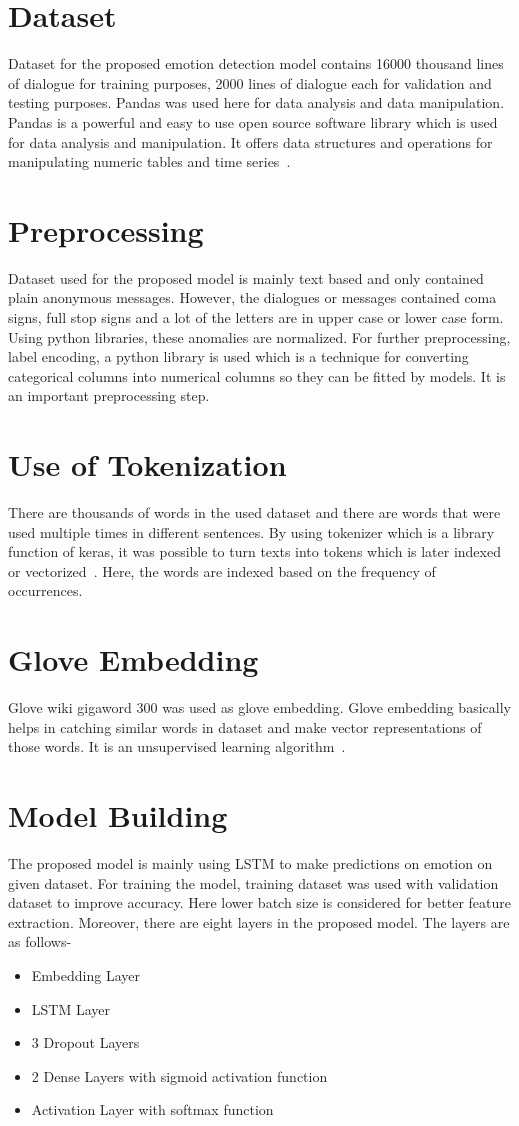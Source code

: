 \section{Dataset}
Dataset for the proposed emotion detection model contains 16000 thousand lines of dialogue for training purposes, 2000 lines of dialogue each for validation and testing purposes. Pandas was used here for data analysis and data manipulation. Pandas is a powerful and easy to use open source software library which is used for data analysis and manipulation. It offers data structures and operations for manipulating numeric tables and time series~\cite{ref11}.

\section{Preprocessing}
Dataset used for the proposed model is mainly text based and only contained plain anonymous messages. However, the dialogues or messages contained coma signs, full stop signs and a lot of the letters are in upper case or lower case form. Using python libraries, these anomalies are normalized. For further preprocessing, label encoding, a python library is used which is a technique for converting categorical columns into numerical columns so they can be fitted by models. It is an important preprocessing step.~\cite{url3} 

\section{Use of Tokenization}
There are thousands of words in the used dataset and there are words that were used multiple times in different sentences. By using tokenizer which is a library function of keras, it was possible to turn texts into tokens which is later indexed or vectorized~\cite{url4}. Here, the words are indexed based on the frequency of occurrences.
\section{Glove Embedding}
Glove wiki gigaword 300 was used as glove embedding. Glove embedding basically helps in catching similar words in dataset and make vector representations of those words. It is an unsupervised learning algorithm~\cite{url5}.
\section{Model Building}
The proposed model is mainly using LSTM to make predictions on emotion on given dataset. For training the model, training dataset was used with validation dataset to improve accuracy. Here lower batch size is considered for better feature extraction. Moreover, there are eight layers in the proposed model. The layers are as follows-
\begin{itemize}
\item Embedding Layer
\item LSTM Layer
\item 3 Dropout Layers
\item 2 Dense Layers with sigmoid activation function
\item Activation Layer with softmax function
\end{itemize}

